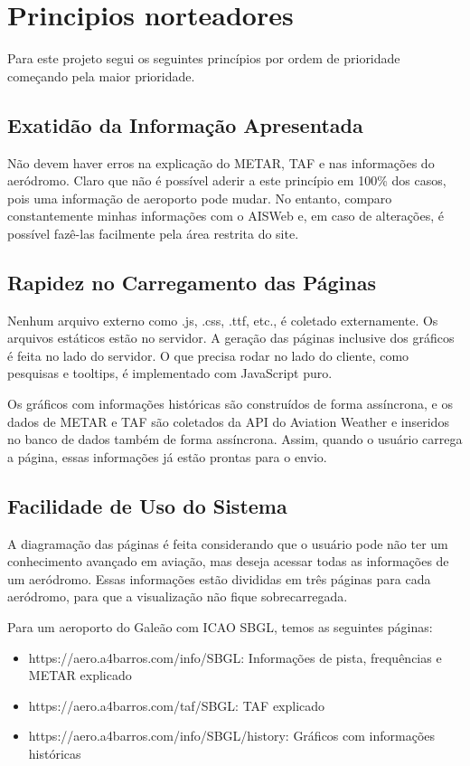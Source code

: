 \chapter{Principios norteadores}

Para este projeto segui os seguintes princípios por ordem de prioridade começando pela maior
prioridade.

\section{Exatidão da Informação Apresentada}
Não devem haver erros na explicação do METAR, TAF e nas informações do aeródromo. Claro que não
é possível aderir a este princípio em 100\% dos casos, pois uma informação de aeroporto pode mudar.
No entanto, comparo constantemente minhas informações com o AISWeb e, em caso de alterações,
é possível fazê-las facilmente pela área restrita do site.

\section{Rapidez no Carregamento das Páginas} Nenhum arquivo externo como .js, .css, .ttf, etc., 
é coletado externamente. Os arquivos estáticos estão no servidor. A geração das páginas inclusive dos
gráficos é feita
no lado do servidor.
O que precisa rodar no lado do cliente, como pesquisas e tooltips, é
implementado com JavaScript puro.

Os gráficos com informações históricas são construídos de forma assíncrona, e os dados de METAR
e TAF são coletados da API do Aviation Weather e inseridos no banco de dados também de forma
assíncrona. Assim, quando o usuário carrega a página, essas informações já estão prontas para o envio.

\section{Facilidade de Uso do Sistema} A diagramação das páginas é feita considerando que o usuário
pode não ter um conhecimento avançado em aviação, mas deseja acessar todas as informações de um
aeródromo. Essas informações estão divididas em três páginas para cada aeródromo, para que a
visualização não fique sobrecarregada.

Para um aeroporto do Galeão com ICAO SBGL, temos as seguintes páginas:

\begin{itemize}
    \item https://aero.a4barros.com/info/SBGL: Informações de pista, frequências e METAR explicado
    \item https://aero.a4barros.com/taf/SBGL: TAF explicado
    \item https://aero.a4barros.com/info/SBGL/history: Gráficos com informações históricas
\end{itemize}